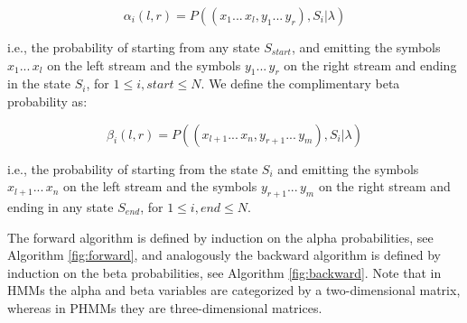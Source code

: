 \documentclass[a4paper,10pt]{article}
\begin{document}
$$\alpha_i(l, r) = P((x_1 ...\, x_l, y_1 ...\, y_r), S_i|\lambda)$$

i.e., the probability of starting from any state $S_{start}$, and emitting the
symbols $x_1 ...\, x_l$ on the left stream and the symbols $y_1 ...\, y_r$ on
the right stream and ending in the state $S_i$, for $1 \leq i, start \leq N$. We
define the complimentary beta probability as:

$$\beta_i(l, r) = P((x_{l+1} ...\, x_n, y_{r+1} ...\, y_m), S_i|\lambda)$$

i.e., the probability of starting from the state $S_i$ and emitting the
symbols $x_{l+1} ...\, x_n$ on the left stream and the symbols $y_{r+1} ...\,
y_m$ on the right stream and ending in any state $S_{end}$, for $1 \leq i, end
\leq N$.

The forward algorithm is defined by induction on the alpha probabilities, see
Algorithm \ref{fig:forward}, and analogously the backward algorithm is defined
by induction on the beta probabilities, see Algorithm \ref{fig:backward}. Note
that in HMMs the alpha and beta variables are categorized by a two-dimensional
matrix, whereas in PHMMs they are three-dimensional matrices.
\end{document}
